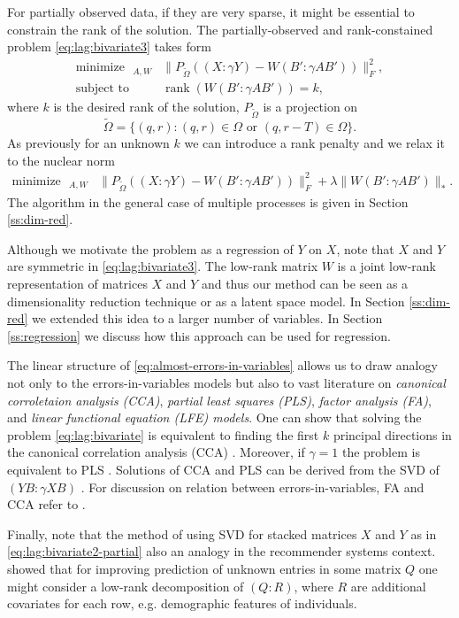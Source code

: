 \documentclass[preprint]{imsart}
\numberwithin{equation}{section}
\theoremstyle{plain}
\DeclareMathOperator*{\rank}{rank}
\DeclareMathOperator*{\minimize}{minimize\ \ }
\DeclareMathOperator*{\subjectto}{subject\ to\ \ }
\begin{document}
For partially observed data, if they are very sparse, it might be essential to constrain the rank of the solution. The partially-observed and rank-constained problem \eqref{eq:lag:bivariate3} takes form 
\begin{align*}%
  \minimize_{A,W} & \| P_{\tilde\Omega}((X:\gamma Y) - W(B':\gamma A B')) \|_F^2,\nonumber\\
  \subjectto & \rank(W(B':\gamma A B')) = k,
\end{align*}
where $k$ is the desired rank of the solution, $P_{\tilde\Omega}$ is a projection on \[\tilde\Omega = \{(q,r): (q,r) \in \Omega \text{ or } (q,r-T) \in \Omega\}. \] As previously for an unknown $k$ we can introduce a rank penalty and we relax it to the nuclear norm
\begin{align}\label{eq:lag:bivariate2-partial}
  \minimize_{A,W} & \| P_{\tilde\Omega}((X:\gamma Y) - W(B':\gamma A B')) \|_F^2 + \lambda\|W(B':\gamma A B')\|_*.
\end{align}
The algorithm in the general case of multiple processes is given in Section \ref{ss:dim-red}.

Although we motivate the problem as a regression of $Y$ on $X$, note that $X$ and $Y$ are symmetric in \eqref{eq:lag:bivariate3}. The low-rank matrix $W$ is a joint low-rank representation of matrices $X$ and $Y$ and thus our method can be seen as a dimensionality reduction technique or as a latent space model. In Section \ref{ss:dim-red} we extended this idea to a larger number of variables. In Section \ref{ss:regression} we discuss how this approach can be used for regression.

The linear structure of \eqref{eq:almost-errors-in-variables} allows us to draw analogy not only to the errors-in-variables models but also to vast literature on {\em canonical corroletaion analysis (CCA)}, {\em partial least squares (PLS)}, {\em factor analysis (FA)}, and {\em linear functional equation (LFE) models}. One can show that solving the problem \eqref{eq:lag:bivariate} is equivalent to finding the first $k$ principal directions in the canonical correlation analysis (CCA) \citep{hotelling1936relations}. Moreover, if $\gamma=1$ the problem is equivalent to PLS \citep{wold1975soft}. Solutions of CCA and PLS can be derived from the SVD of $(YB:\gamma XB)$ \citep{borga1997unified}. For discussion on relation between errors-in-variables, FA and CCA refer to \cite{gleser1981estimation}.

Finally, note that the method of using SVD for stacked matrices $X$ and $Y$ as in \eqref{eq:lag:bivariate2-partial} also an analogy in the recommender systems context. \citet{condli1999bayesian} showed that for improving prediction of unknown entries in some matrix $Q$ one might consider a low-rank decomposition of $(Q:R)$, where $R$ are additional covariates for each row, e.g. demographic features of individuals. %
\end{document}
